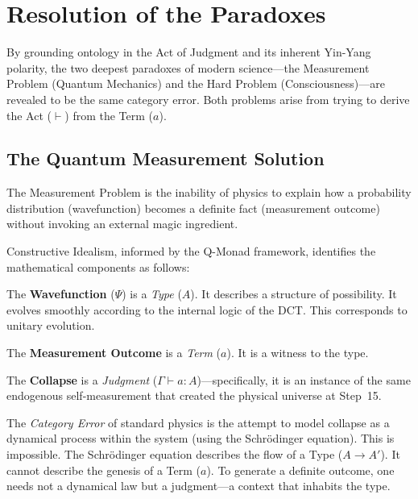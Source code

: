 \documentclass[12pt,a4paper]{article}
\newcommand{\turnstile}{\vdash}
\begin{document}
\section{Resolution of the Paradoxes}
\label{sec:paradoxes}

By grounding ontology in the Act of Judgment and its inherent Yin-Yang polarity, the two deepest paradoxes of modern science---the Measurement Problem (Quantum Mechanics) and the Hard Problem (Consciousness)---are revealed to be the same category error. Both problems arise from trying to derive the Act ($\turnstile$) from the Term ($a$).


\subsection{The Quantum Measurement Solution}
\label{sec:measurement}

The Measurement Problem is the inability of physics to explain how a probability distribution (wavefunction) becomes a definite fact (measurement outcome) without invoking an external magic ingredient.

Constructive Idealism, informed by the Q-Monad framework, identifies the mathematical components as follows:

The \textbf{Wavefunction} ($\Psi$) is a \emph{Type} ($A$). It describes a structure of possibility. It evolves smoothly according to the internal logic of the DCT. This corresponds to unitary evolution.

The \textbf{Measurement Outcome} is a \emph{Term} ($a$). It is a witness to the type.

The \textbf{Collapse} is a \emph{Judgment} ($\Gamma \turnstile a : A$)---specifically, it is an instance of the same endogenous self-measurement that created the physical universe at Step~15.

The \emph{Category Error} of standard physics is the attempt to model collapse as a dynamical process within the system (using the Schr\"odinger equation). This is impossible. The Schr\"odinger equation describes the flow of a Type ($A \to A'$). It cannot describe the genesis of a Term ($a$). To generate a definite outcome, one needs not a dynamical law but a judgment---a context that inhabits the type.
\end{document}
